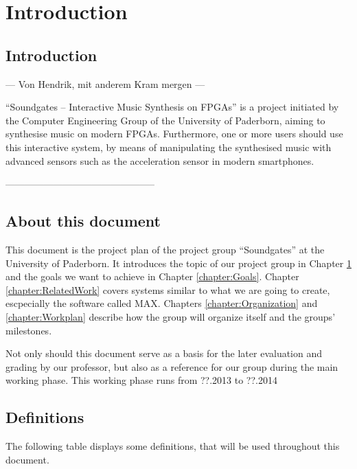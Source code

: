 \chapter{Introduction}
	\label{chapter:Introduction}
	\section{Introduction}
	--- Von Hendrik, mit anderem Kram mergen ---
	
	
"`Soundgates – Interactive Music Synthesis on FPGAs"' is a project initiated by the Computer Engineering Group of the University of Paderborn, aiming to synthesise music on modern FPGAs. 
Furthermore, one or more users should use this interactive system, by means of manipulating the synthesised music with advanced sensors such as the acceleration sensor in modern smartphones.
	
	
	-----------------------------------------------
	
	
	\section{About this document}
	This document is the project plan of the project group ``Soundgates'' at the University of Paderborn. 
	It introduces the topic of our project group in Chapter \ref{chapter:Introduction} and the goals we want to achieve in Chapter \ref{chapter:Goals}.
	Chapter \ref{chapter:RelatedWork} covers systems similar to what we are going to create, escpecially the software called MAX.
	Chapters \ref{chapter:Organization} and \ref{chapter:Workplan} describe how the group will organize itself and the groups' milestones.

	Not only should this document serve as a basis for the later evaluation and grading by our professor, but also as a reference for our group during the main working phase.
	This working phase runs from ??.2013 to ??.2014
	\section{Definitions}
	 The following table displays some definitions, that will be used throughout this document.
	
